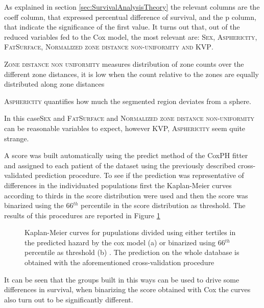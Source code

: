 As explained in section \ref{sec:SurvivalAnalysisTheory} the relevant columns are the coeff column, that expressed percentual difference of survival, and the p column, that indicate the significance of the first value.
It turns out that, out of the reduced variables fed to the Cox model, the most relevant are: {\scshape Sex, Asphericity, FatSurface, Normalized zone distance non-uniformity and KVP}.

{\scshape Zone distance non uniformity} measures distribution of zone counts over the different zone distances, it is low when the count relative to the zones are equally distributed along zone distances

{\scshape Asphericity} quantifies how much the segmented region deviates from a sphere.


In this case{\scshape Sex} and {\scshape FatSurface} and {\scshape Normalized zone distance non-uniformity} can be reasonable variables to expect, however {\scshape KVP, Asphericity} seem quite strange.

A score was built automatically using the predict method of the CoxPH fitter and assigned to each patient of the dataset using the previously described cross-validated prediction procedure.
To see if the prediction was representative of differences in the individuated populations first the Kaplan-Meier curves according to thirds in the score distribution were used and then the score was binarized using the 66$^{th}$ percentile in the score distribution as threshold.
The results of this procedures are reported in Figure \ref{fig:KmCoxScore}

\begin{figure}[H]
\centering
	\newline
        \caption{Kaplan-Meier curves for pupulations divided using either tertiles in the predicted hazard by the cox model (a) or binarized using 66$^{th}$ percentile as threshold (b) . The prediction on the whole database is obtained with the aforementioned cross-validation procedure }\label{fig:KmCoxScore}
\end{figure}

It can be seen that the groups built in this ways can be used to drive some differences in survival, when binarizing the score obtained with Cox the curves also turn out to be significantly different.

